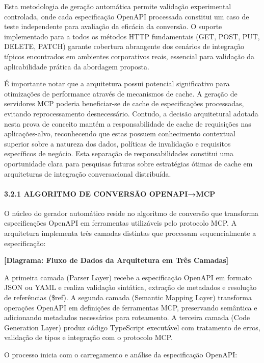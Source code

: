 \documentclass[
]{article}
\begin{document}
Esta metodologia de geração automática permite validação experimental
controlada, onde cada especificação OpenAPI processada constitui um caso
de teste independente para avaliação da eficácia da conversão. O suporte
implementado para a todos os métodos HTTP fundamentais (GET, POST, PUT,
DELETE, PATCH) garante cobertura abrangente dos cenários de integração
típicos encontrados em ambientes corporativos reais, essencial para
validação da aplicabilidade prática da abordagem proposta.

É importante notar que a arquitetura possui potencial significativo para
otimizações de performance através de mecanismos de cache. A geração de
servidores MCP poderia beneficiar-se de cache de especificações
processadas, evitando reprocessamento desnecessário. Contudo, a decisão
arquitetural adotada nesta prova de conceito mantém a responsabilidade
de cache de requisições nas aplicações-alvo, reconhecendo que estas
possuem conhecimento contextual superior sobre a natureza dos dados,
políticas de invalidação e requisitos específicos de negócio. Esta
separação de responsabilidades constitui uma oportunidade clara para
pesquisas futuras sobre estratégias ótimas de cache em arquiteturas de
integração conversacional distribuída.

\paragraph{3.2.1 ALGORITMO DE CONVERSÃO
OPENAPI→MCP}\label{algoritmo-de-conversuxe3o-openapimcp}

O núcleo do gerador automático reside no algoritmo de conversão que
transforma especificações OpenAPI em ferramentas utilizáveis pelo
protocolo MCP. A arquitetura implementa três camadas distintas que
processam sequencialmente a especificação:

\textbf{{[}Diagrama: Fluxo de Dados da Arquitetura em Três Camadas{]}}

A primeira camada (Parser Layer) recebe a especificação OpenAPI em
formato JSON ou YAML e realiza validação sintática, extração de
metadados e resolução de referências (\$ref). A segunda camada (Semantic
Mapping Layer) transforma operações OpenAPI em definições de ferramentas
MCP, preservando semântica e adicionando metadados necessários para
roteamento. A terceira camada (Code Generation Layer) produz código
TypeScript executável com tratamento de erros, validação de tipos e
integração com o protocolo MCP.

O processo inicia com o carregamento e análise da especificação OpenAPI:
\end{document}
